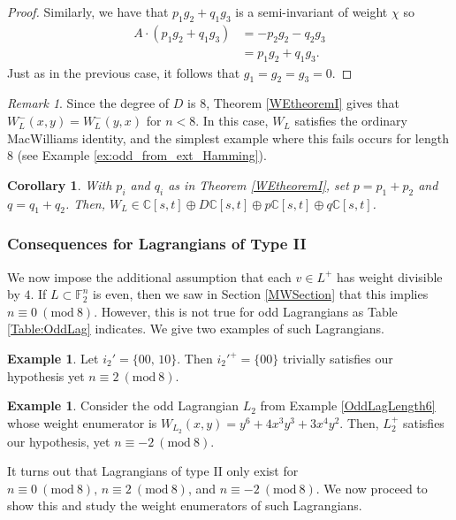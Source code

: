 \documentclass[a4paper,reqno]{amsart}
\newtheorem{corollary}[theorem]{Corollary}
\theoremstyle{definition}
\newtheorem{example}[theorem]{Example}
\theoremstyle{remark} \newtheorem{remark}[theorem]{Remark}
\numberwithin{equation}{section}
\begin{document}
\begin{proof}
    Similarly, we have that \(p_1g_2 + q_1g_3\) is a semi-invariant of weight \(\chi\) so
    \begin{align*}
        A \cdot (p_1g_2 + q_1g_3) &= -p_2 g_2 - q_2 g_3 \\
        & = p_1g_2 + q_1g_3.
    \end{align*}
    Just as in the previous case, it follows that \(g_1 = g_2 = g_3 = 0\).
\end{proof}

\begin{remark}
    Since the degree of \(D\) is \(8\), Theorem \ref{WEtheoremI} gives that \(W_L^-(x,y) = W_L^-(y,x)\) for \(n < 8\). In this case, \(W_L\) satisfies the ordinary MacWilliams identity, and the simplest example where this fails occurs for length \(8\) (see Example \ref{ex:odd_from_ext_Hamming}).
\end{remark}

\begin{corollary}
    With \(p_i\) and \(q_i\) as in Theorem \ref{WEtheoremI}, set \(p = p_1 + p_2\) and \(q = q_1 + q_2\). Then, \(W_L \in \mathbb{C}[s,t] \oplus D\mathbb{C}[s,t] \oplus p\mathbb{C}[s,t] \oplus q\mathbb{C}[s,t]\).
\end{corollary}

\subsubsection{Consequences for Lagrangians of Type II} We now impose the additional assumption that each \(v \in L^+\) has weight divisible by \(4\). If \(L \subset \mathbb{F}_2^n\) is even, then we saw in Section \ref{MWSection} that this implies \(n \equiv 0 \ (\textrm{mod}\ 8)\). However, this is not true for odd Lagrangians as Table \ref{Table:OddLag} indicates. We give two examples of such Lagrangians.

\begin{example}
    Let \(i_2' = \{00,\, 10\}\). Then \(i_2'^+ = \{00\}\) trivially satisfies our hypothesis yet \(n \equiv 2 \ (\textrm{mod}\ 8)\).
\end{example}

\begin{example}
    Consider the odd Lagrangian \(L_2\) from Example \ref{OddLagLength6} whose weight enumerator is \(W_{L_2}(x,y) = y^6 + 4x^3y^3 + 3x^4y^2\). Then, \(L_2^+\) satisfies our hypothesis, yet \(n \equiv -2 \ (\textrm{mod}\ 8)\).
\end{example}

It turns out that Lagrangians of type II only exist for \(n \equiv 0\ (\textrm{mod}\ 8),\, n \equiv 2 \ (\textrm{mod}\ 8)\), and \(n \equiv -2 \ (\textrm{mod}\ 8)\). We now proceed to show this and study the weight enumerators of such Lagrangians.
\end{document}
